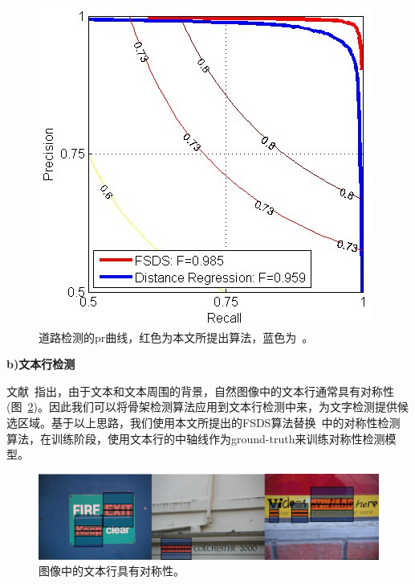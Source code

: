 \documentclass[UTF8]{ctexart}
\numberwithin{equation}{section} %
\numberwithin{table}{section} %
\begin{document}
\begin{figure}[H]
\centering
\includegraphics[scale=1]{figures/road_detection_pr}
\caption{道路检测的pr曲线，红色为本文所提出算法，蓝色为~\cite{sironi2014multiscale}。}
\label{fig:road_pr}
\end{figure}

\noindent \textbf{b)文本行检测}

文献~\cite{Zhang15}指出，由于文本和文本周围的背景，自然图像中的文本行通常具有对称性(图~\ref{fig:text_line})。因此我们可以将骨架检测算法应用到文本行检测中来，为文字检测提供候选区域。基于以上思路，我们使用本文所提出的FSDS算法替换~\cite{Zhang15}中的对称性检测算法，在训练阶段，使用文本行的中轴线作为ground-truth来训练对称性检测模型。
\begin{figure}[H]
\centering
\includegraphics[scale=0.35]{figures/text_lines.jpg}
\caption{图像中的文本行具有对称性。}
\label{fig:text_line}
\end{figure}
\end{document}

